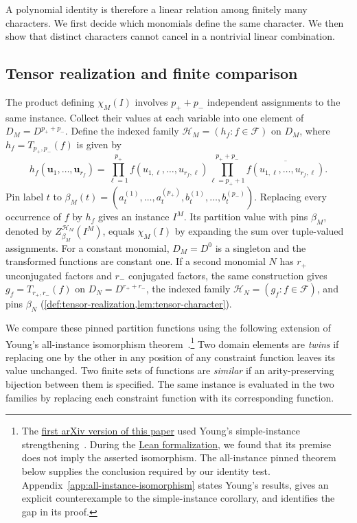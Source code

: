 \documentclass[11pt,letterpaper,onecolumn]{article}
\theoremstyle{plain}
\theoremstyle{definition}
\theoremstyle{remark}
\newcommand{\cF}{\mathcal F}
\begin{document}
A polynomial identity is therefore a linear relation among finitely
many characters. We first decide which monomials define the same
character. We then show that distinct characters cannot cancel in
a nontrivial linear combination.

\subsection{Tensor realization and finite comparison}

The product defining $\chi_M(I)$ involves $p_++p_-$ independent
assignments to the same instance. Collect their values at each variable
into one element of $D_M=D^{p_++p_-}$. Define the indexed family
$\mathcal H_M=(h_f:f\in\cF)$ on $D_M$, where $h_f=T_{p_+,p_-}(f)$
is given by
\[
 h_f(\mathbf u_1,\ldots,\mathbf u_{r_f})
 =\prod_{\ell=1}^{p_+}f(u_{1,\ell},\ldots,u_{r_f,\ell})
  \prod_{\ell=p_++1}^{p_++p_-}
                 \overline{f(u_{1,\ell},\ldots,u_{r_f,\ell})}.
\]
Pin label $t$ to
$\beta_M(t)=(a_t^{(1)},\ldots,a_t^{(p_+)},
b_t^{(1)},\ldots,b_t^{(p_-)})$.
Replacing every occurrence of $f$ by $h_f$ gives an instance $I^M$.
Its partition value with pins $\beta_M$, denoted by
$Z_{\beta_M}^{\mathcal H_M}(I^M)$, equals $\chi_M(I)$ by expanding
the sum over tuple-valued assignments.
For a constant monomial, $D_M=D^0$ is a singleton and the transformed
functions are constant one. If a second monomial $N$ has $r_+$
unconjugated factors and $r_-$ conjugated factors, the same construction
gives $g_f=T_{r_+,r_-}(f)$ on $D_N=D^{r_++r_-}$, the indexed family
$\mathcal H_N=(g_f:f\in\cF)$, and pins $\beta_N$
(\cref{def:tensor-realization,lem:tensor-character}).

We compare these pinned partition functions using the following
extension of Young's all-instance isomorphism
theorem~\cite[Theorem~8]{Young2025}.\footnote{The
\href{https://arxiv.org/abs/2608.14845v1}{first arXiv version of this paper}
used Young's simple-instance strengthening~\cite[Corollary~35]{Young2025}.
During the
\href{https://github.com/liuchliuch/complex-csp-decidability-lean}{Lean formalization},
we found that its premise does not imply the asserted isomorphism.
The all-instance pinned theorem below supplies the conclusion required
by our identity test. Appendix~\ref{app:all-instance-isomorphism} states
Young's results, gives an explicit counterexample to the simple-instance
corollary, and identifies the gap in its proof.}
Two domain elements are \emph{twins} if replacing one by the other in
any position of any constraint function leaves its value unchanged.
Two finite sets of functions are \emph{similar} if an arity-preserving
bijection between them is specified. The same instance is evaluated
in the two families by replacing each constraint function with its
corresponding function.
\end{document}
